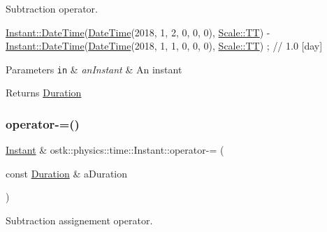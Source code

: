 Subtraction operator. 


\begin{DoxyCode}
\hyperlink{classostk_1_1physics_1_1time_1_1_instant_afd5725574a02389b80fad4baff313c8a}{Instant::DateTime}(\hyperlink{classostk_1_1physics_1_1time_1_1_instant_afd5725574a02389b80fad4baff313c8a}{DateTime}(2018, 1, 2, 0, 0, 0), 
      \hyperlink{namespaceostk_1_1physics_1_1time_adf23d37bd8641fb76a0e98ab46a70df7adf1f3edb9115acb0a1e04209b7a9937b}{Scale::TT}) - \hyperlink{classostk_1_1physics_1_1time_1_1_instant_afd5725574a02389b80fad4baff313c8a}{Instant::DateTime}(\hyperlink{classostk_1_1physics_1_1time_1_1_instant_afd5725574a02389b80fad4baff313c8a}{DateTime}(2018, 1, 1, 0, 0, 0), 
      \hyperlink{namespaceostk_1_1physics_1_1time_adf23d37bd8641fb76a0e98ab46a70df7adf1f3edb9115acb0a1e04209b7a9937b}{Scale::TT}) ; \textcolor{comment}{// 1.0 [day]}
\end{DoxyCode}



\begin{DoxyParams}[1]{Parameters}
\mbox{\tt in}  & {\em an\+Instant} & An instant \\
\hline
\end{DoxyParams}
\begin{DoxyReturn}{Returns}
\hyperlink{classostk_1_1physics_1_1time_1_1_duration}{Duration} 
\end{DoxyReturn}
\mbox{\label{classostk_1_1physics_1_1time_1_1_instant_abac01f937383ef281b4047ad692453ba}} 
\subsubsection{\texorpdfstring{operator-\/=()}{operator-=()}}
{\footnotesize\ttfamily \hyperlink{classostk_1_1physics_1_1time_1_1_instant}{Instant} \& ostk\+::physics\+::time\+::\+Instant\+::operator-\/= (\begin{DoxyParamCaption}\item[{const \hyperlink{classostk_1_1physics_1_1time_1_1_duration}{Duration} \&}]{a\+Duration }\end{DoxyParamCaption})}



Subtraction assignement operator. 


